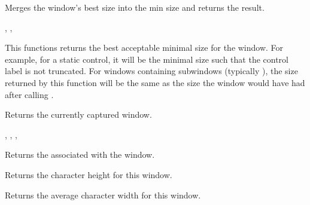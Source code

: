 \label{wxwindowgetbestfittingsize}


Merges the window's best size into the min size and returns the result.


,\rtfsp
{},\rtfsp
{}


\label{wxwindowgetbestsize}


This functions returns the best acceptable minimal size for the window. For
example, for a static control, it will be the minimal size such that the
control label is not truncated. For windows containing subwindows (typically
), the size returned by this function will be the
same as the size the window would have had after calling
.


\label{wxwindowgetcapture}


Returns the currently captured window.


,
,
,


\label{wxwindowgetcaret}


Returns the  associated with the window.


\label{wxwindowgetcharheight}


Returns the character height for this window.


\label{wxwindowgetcharwidth}


Returns the average character width for this window.


